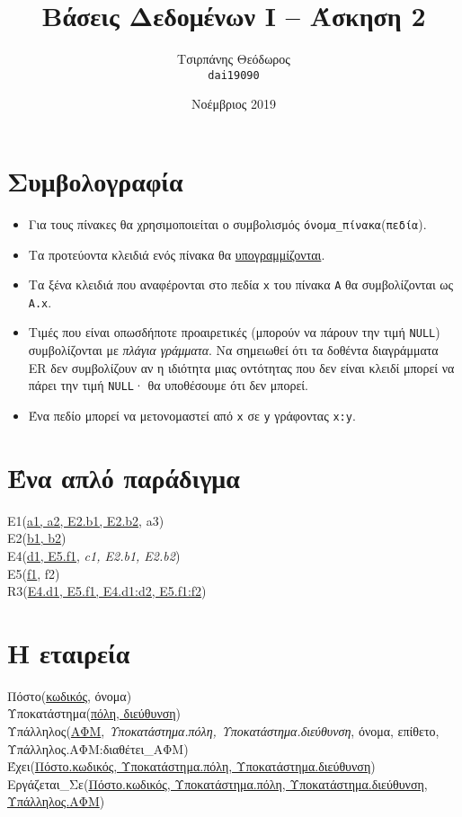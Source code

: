 \documentclass{article}
\title{Βάσεις Δεδομένων I -- Άσκηση 2}
\author{Τσιρπάνης Θεόδωρος\\ \texttt{dai19090}}
\date{Νοέμβριος 2019}
\begin{document}

\maketitle

\section*{Συμβολογραφία}

\begin{itemize}
\item Για τους πίνακες θα χρησιμοποιείται ο συμβολισμός \texttt{όνομα\_πίνακα}(\texttt{πεδία}).

\item Τα προτεύοντα κλειδιά ενός πίνακα θα \underline{υπογραμμίζονται}.

\item Τα ξένα κλειδιά που αναφέρονται στο πεδία \texttt{x} του πίνακα \texttt{A} θα συμβολίζονται ως \texttt{A.x}.

\item Τιμές που είναι οπωσδήποτε προαιρετικές (μπορούν να πάρουν την τιμή \texttt{NULL}) συμβολίζονται με \textit{πλάγια γράμματα}.
Να σημειωθεί ότι τα δοθέντα διαγράμματα ER δεν συμβολίζουν αν η ιδιότητα μιας οντότητας που δεν είναι κλειδί μπορεί να πάρει την τιμή \texttt{NULL}· θα υποθέσουμε ότι δεν μπορεί.

\item Ένα πεδίο μπορεί να μετονομαστεί από \texttt{x} σε \texttt{y} γράφοντας \texttt{x:y}.
\end{itemize}


\section{Ένα απλό παράδιγμα}

Ε1(\underline{a1, a2, E2.b1, E2.b2}, a3) \\
E2(\underline{b1, b2}) \\
E4(\underline{d1, E5.f1}, \textit{c1, E2.b1, E2.b2}) \\
E5(\underline{f1}, f2) \\
R3(\underline{E4.d1, E5.f1, E4.d1:d2, E5.f1:f2})

\section{Η εταιρεία}

Πόστο(\underline{κωδικός}, όνομα) \\
Υποκατάστημα(\underline{πόλη, διεύθυνση}) \\
Υπάλληλος(\underline{ΑΦΜ}, \textit{Υποκατάστημα.πόλη, Υποκατάστημα.διεύθυνση}, όνομα, επίθετο, Υπάλληλος.ΑΦΜ:διαθέτει\_ΑΦΜ) \\
Έχει(\underline{Πόστο.κωδικός, Υποκατάστημα.πόλη, Υποκατάστημα.διεύθυνση}) \\
Εργάζεται\_Σε(\underline{Πόστο.κωδικός, Υποκατάστημα.πόλη, Υποκατάστημα.διεύθυνση, Υπάλληλος.ΑΦΜ})
\end{document}

